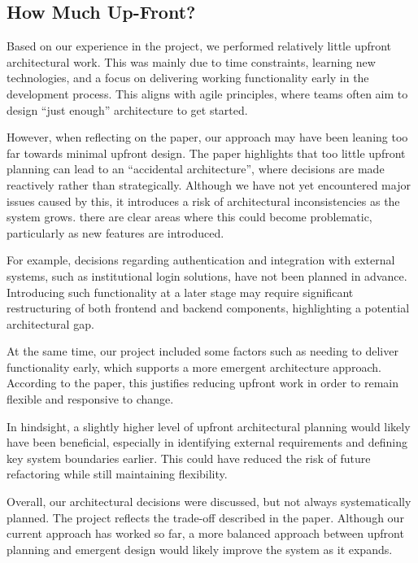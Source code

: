 

\subsection{How Much Up-Front?} %
Based on our experience in the project, we performed relatively little upfront architectural work.
This was mainly due to time constraints, learning new technologies, and a focus on delivering working functionality early in the development process.
This aligns with agile principles, where teams often aim to design “just enough” architecture to get started.

However, when reflecting on the paper\cite{UpFront}, our approach may have been leaning too far towards minimal upfront design.
The paper highlights that too little upfront planning can lead to an “accidental architecture”,
where decisions are made reactively rather than strategically.
Although we have not yet encountered major issues caused by this,
it introduces a risk of architectural inconsistencies as the system grows.
there are clear areas where this could become problematic, particularly as new
features are introduced.

For example, decisions regarding authentication and integration with external systems,
such as institutional login solutions, have not been planned in advance.
Introducing such functionality at a later stage may require significant restructuring
of both frontend and backend components, highlighting a potential architectural gap.

At the same time, our project included some factors such as needing to deliver functionality early, which supports a more emergent architecture approach.
According to the paper, this justifies reducing upfront work in order to remain flexible and responsive to change. 

In hindsight, a slightly higher level of upfront architectural planning would likely have been beneficial,
especially in identifying external requirements and defining key system boundaries earlier.
This could have reduced the risk of future refactoring while still maintaining flexibility.

Overall, our architectural decisions were discussed, but not always systematically planned.
The project reflects the trade-off described in the paper.
Although our current approach has worked so far, a more balanced approach between upfront planning and emergent design would likely improve the system as it expands.


